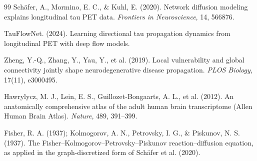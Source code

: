 \documentclass{article}
\begin{document}
\begin{thebibliography}{99}
Sch\"afer, A., Mormino, E. C., \& Kuhl, E. (2020).
Network diffusion modeling explains longitudinal tau PET data.
\textit{Frontiers in Neuroscience}, 14, 566876.

TauFlowNet. (2024).
Learning directional tau propagation dynamics from longitudinal PET with deep flow models.

Zheng, Y.-Q., Zhang, Y., Yau, Y., et al. (2019).
Local vulnerability and global connectivity jointly shape neurodegenerative disease propagation.
\textit{PLOS Biology}, 17(11), e3000495.

Hawrylycz, M. J., Lein, E. S., Guillozet-Bongaarts, A. L., et al. (2012).
An anatomically comprehensive atlas of the adult human brain transcriptome (Allen Human Brain Atlas).
\textit{Nature}, 489, 391--399.

Fisher, R. A. (1937); Kolmogorov, A. N., Petrovsky, I. G., \& Piskunov, N. S. (1937).
The Fisher--Kolmogorov--Petrovsky--Piskunov reaction--diffusion equation, as applied in the graph-discretized form of Sch\"afer et al. (2020).

\end{thebibliography}
\end{document}
